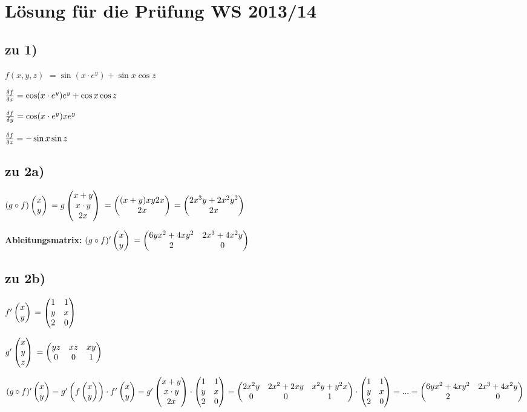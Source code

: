 \renewcommand{\ldate}{2015-12-17}


\section{Lösung für die Prüfung WS 2013/14}

\subsection{zu 1)}
$f(x,y,z)$
$ =\sin(x\cdot e^y) + \sin x \cos z$

$ \frac{\delta f}{\delta x} = \cos (x\cdot e^y) e^y + \cos x \cos z$

$ \frac{\delta f}{\delta y} = \cos (x\cdot e^y) x e^y $

$ \frac{\delta f}{\delta z} = -\sin x \sin z$

\subsection{zu 2a)}
$ (g\circ f)  \begin{pmatrix} x\\y \end{pmatrix}  $
$= g \begin{pmatrix} x+y\\x\cdot y\\2x \end{pmatrix} $
$= \begin{pmatrix} (x+y) x y 2 x \\ 2x \end{pmatrix} $
$= \begin{pmatrix} 2x^3y + 2x^2y^2\\2x \end{pmatrix} $

\textbf{Ableitungsmatrix:}
$ (g\circ f)'  \begin{pmatrix} x\\y \end{pmatrix}  $
$= \begin{pmatrix} 6yx^2 + 4xy^2 & 2x^3 + 4x^2y\\2 & 0 \end{pmatrix} $

\subsection{zu 2b)}
$f' \begin{pmatrix} x\\y \end{pmatrix} $
$= \begin{pmatrix} 1 & 1\\y & x\\2 & 0 \end{pmatrix} $

$g' \begin{pmatrix} x\\y\\z \end{pmatrix} $
$= \begin{pmatrix} yz & xz & xy\\0 & 0 & 1 \end{pmatrix} $

$
(g\circ f)'  \begin{pmatrix} x\\y \end{pmatrix}  
=g'  \left( f  \begin{pmatrix} x\\y \end{pmatrix}  \right)   \cdot f' \begin{pmatrix} x\\y \end{pmatrix} 
=g' \begin{pmatrix} x+y\\x\cdot y\\2x \end{pmatrix}   \cdot  \begin{pmatrix} 1 & 1\\y & x\\2 & 0 \end{pmatrix}  
= \begin{pmatrix} 2x^2y & 2x^2+2xy & x^2y+y^2x\\0 & 0 & 1 \end{pmatrix}  \cdot  \begin{pmatrix} 1 & 1\\y & x\\2 & 0 \end{pmatrix}  
=...= \begin{pmatrix} 6yx^2 + 4xy^2 & 2x^3+4x^2y\\2 & 0 \end{pmatrix} 
$

